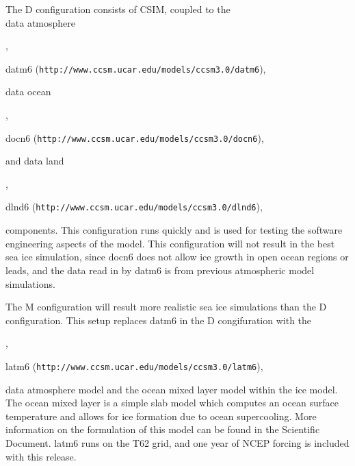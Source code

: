 The D configuration consists of CSIM, coupled to the \\
data atmosphere 
\begin{htmlonly}
, \\
\end{htmlonly}
\begin{latexonly}
datm6 ({\tt http://www.ccsm.ucar.edu/models/ccsm3.0/datm6}), \\
\end{latexonly}
data ocean
\begin{htmlonly}
, \\
\end{htmlonly}
\begin{latexonly}
docn6 ({\tt http://www.ccsm.ucar.edu/models/ccsm3.0/docn6}), \\
\end{latexonly}
and data land
\begin{htmlonly}
, \\
\end{htmlonly}
\begin{latexonly}
dlnd6 ({\tt http://www.ccsm.ucar.edu/models/ccsm3.0/dlnd6}), \\
\end{latexonly}
components.  This configuration runs quickly and is used for testing the
software engineering aspects of the model.  This configuration will not
result in the best sea ice simulation, since docn6 does not allow ice growth
in open ocean regions or leads, and the data read in by datm6 is from previous
atmospheric model simulations.

The M configuration will result more realistic sea ice simulations than the
D configuration.  This setup replaces datm6 in the D congifuration with the
\begin{htmlonly}
  ,
\end{htmlonly}
\begin{latexonly}
  latm6 ({\tt http://www.ccsm.ucar.edu/models/ccsm3.0/latm6}),
\end{latexonly}
data atmosphere model and the ocean mixed layer model within the ice model.
The ocean mixed layer is a simple slab model which computes an ocean surface
temperature and allows for ice formation due to ocean supercooling.  More
information on the formulation of this model can be found in the Scientific
Document.  latm6 runs on the T62 grid, and one year of NCEP forcing is
included with this release. 

